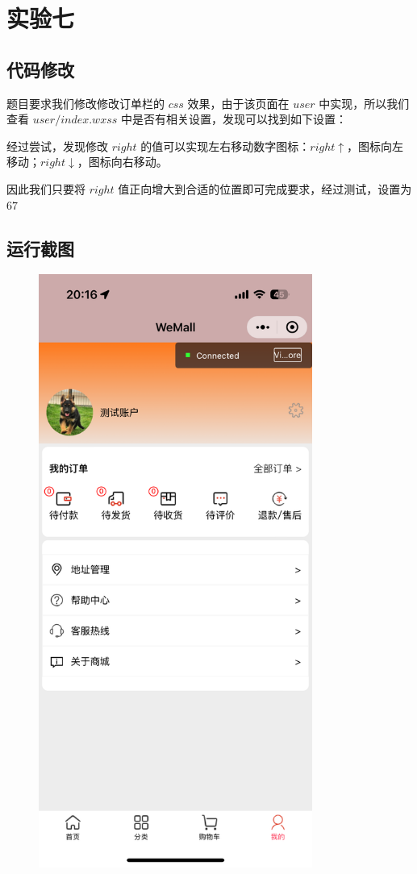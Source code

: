 \section{实验七}
    \subsection{代码修改}
        \par 题目要求我们修改修改订单栏的 $css$ 效果，由于该页面在 $user$ 中实现，所以我们查看 $user/index.wxss$ 中是否有相关设置，发现可以找到如下设置：
        
        \par 经过尝试，发现修改 $right$ 的值可以实现左右移动数字图标：$right \uparrow$，图标向左移动；$right \downarrow$，图标向右移动。
        \par 因此我们只要将 $right$ 值正向增大到合适的位置即可完成要求，经过测试，设置为 $67$
        
    \subsection{运行截图}
        \begin{figure}[htbp]
            \centering
            \includegraphics*[width=0.8\textwidth]{shit_complete.jpg}
        \end{figure}